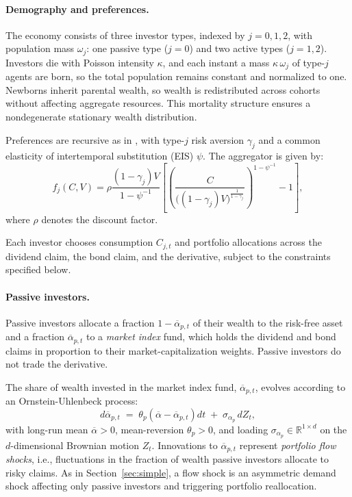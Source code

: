 \documentclass[12pt,english]{article}
\begin{document}
\paragraph{Demography and preferences.}

The economy consists of three investor types, indexed by $j=0,1,2$, with population mass $\omega_j$: one passive type ($j=0$) and two active types ($j=1,2$). 
Investors die with Poisson intensity $\kappa$, and each instant a mass $\kappa\,\omega_j$ of type-$j$ agents are born, so the total population remains constant and normalized to one. 
Newborns inherit parental wealth, so wealth is redistributed across cohorts without affecting aggregate resources. 
This mortality structure ensures a nondegenerate stationary wealth distribution.

Preferences are recursive as in \citet{duffie1992stochastic}, with type-$j$ risk aversion $\gamma_j$ and a common elasticity of intertemporal substitution (EIS) $\psi$. 
The aggregator is given by:
\begin{equation}
    f_j(C,V) = \rho \frac{(1-\gamma_j) V}{1-\psi^{-1}} 
    \left[ \left( \frac{C}{\big((1-\gamma_j)V\big)^{\frac{1}{1-\gamma_j}}} \right)^{1-\psi^{-1}} - 1 \right],
\end{equation}
where $\rho$ denotes the discount factor.

Each investor chooses consumption $C_{j,t}$ and portfolio allocations across the dividend claim, the bond claim, and the derivative, subject to the constraints specified below.

\paragraph{Passive investors.}
Passive investors allocate a fraction $1-\overline{\alpha}_{p,t}$ of their wealth to the risk-free asset and a fraction $\overline{\alpha}_{p,t}$ to a \textit{market index} fund, which holds the dividend and bond claims in proportion to their market-capitalization weights. 
Passive investors do not trade the derivative.

The share of wealth invested in the market index fund, $\overline{\alpha}_{p,t}$, evolves according to an Ornstein-Uhlenbeck process:
\begin{equation}\label{eq:alpha_p_process}
    d\overline{\alpha}_{p,t}
    \;=\;
    \theta_p\!\left(\overline{\alpha}-\overline{\alpha}_{p,t}\right)\!dt
    \;+\;
    \sigma_{\alpha_p}\,dZ_t,
\end{equation}
with long-run mean $\overline{\alpha}>0$, mean-reversion $\theta_p>0$, and loading $\sigma_{\alpha_p}\in\mathbb{R}^{1\times d}$ on the $d$-dimensional Brownian motion $Z_t$.
Innovations to $\overline{\alpha}_{p,t}$ represent \emph{portfolio flow shocks}, i.e., fluctuations in the fraction of wealth passive investors allocate to risky claims.
As in Section~\ref{sec:simple}, a flow shock is an asymmetric demand shock affecting only passive investors and triggering portfolio reallocation.
\end{document}
